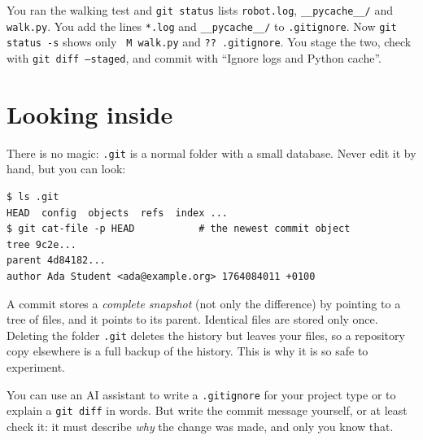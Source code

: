 \begin{example}
You ran the walking test and \texttt{git status} lists \texttt{robot.log}, \texttt{\_\_pycache\_\_/} and \texttt{walk.py}. You add the lines \texttt{*.log} and \texttt{\_\_pycache\_\_/} to \texttt{.gitignore}. Now \texttt{git status -s} shows only \texttt{\ M walk.py} and \texttt{?? .gitignore}. You stage the two, check with \texttt{git diff --staged}, and commit with ``Ignore logs and Python cache''.
\end{example}

\section*{Looking inside}
There is no magic: \texttt{.git} is a normal folder with a small database. Never edit it by hand, but you can look:
\begin{verbatim}
$ ls .git
HEAD  config  objects  refs  index ...
$ git cat-file -p HEAD           # the newest commit object
tree 9c2e...
parent 4d84182...
author Ada Student <ada@example.org> 1764084011 +0100
\end{verbatim}
A commit stores a \emph{complete snapshot} (not only the difference) by pointing to a tree of files, and it points to its parent. Identical files are stored only once. Deleting the folder \texttt{.git} deletes the history but leaves your files, so a repository copy elsewhere is a full backup of the history. This is why it is so safe to experiment.

\begin{aibox}
You can use an AI assistant to write a \texttt{.gitignore} for your project type or to explain a \texttt{git diff} in words. But write the commit message yourself, or at least check it: it must describe \emph{why} the change was made, and only you know that.
\end{aibox}


